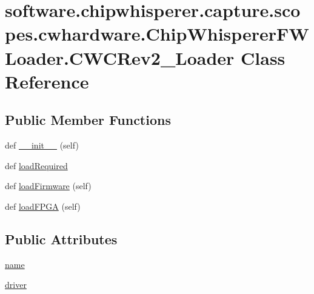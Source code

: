 \hypertarget{classsoftware_1_1chipwhisperer_1_1capture_1_1scopes_1_1cwhardware_1_1ChipWhispererFWLoader_1_1CWCRev2__Loader}{}\section{software.\+chipwhisperer.\+capture.\+scopes.\+cwhardware.\+Chip\+Whisperer\+F\+W\+Loader.\+C\+W\+C\+Rev2\+\_\+\+Loader Class Reference}
\label{classsoftware_1_1chipwhisperer_1_1capture_1_1scopes_1_1cwhardware_1_1ChipWhispererFWLoader_1_1CWCRev2__Loader}
\subsection*{Public Member Functions}
\begin{DoxyCompactItemize}
\item 
def \hyperlink{classsoftware_1_1chipwhisperer_1_1capture_1_1scopes_1_1cwhardware_1_1ChipWhispererFWLoader_1_1CWCRev2__Loader_a1d85659b55e50f31a0968f01e716eab5}{\+\_\+\+\_\+init\+\_\+\+\_\+} (self)
\item 
def \hyperlink{classsoftware_1_1chipwhisperer_1_1capture_1_1scopes_1_1cwhardware_1_1ChipWhispererFWLoader_1_1CWCRev2__Loader_a661fafff10a6a084cdf98057a0edf209}{load\+Required}
\item 
def \hyperlink{classsoftware_1_1chipwhisperer_1_1capture_1_1scopes_1_1cwhardware_1_1ChipWhispererFWLoader_1_1CWCRev2__Loader_aadd7278ccf9ade8801a01703d02f359b}{load\+Firmware} (self)
\item 
def \hyperlink{classsoftware_1_1chipwhisperer_1_1capture_1_1scopes_1_1cwhardware_1_1ChipWhispererFWLoader_1_1CWCRev2__Loader_a1b8a33d698ae66d43070e569727e7e1c}{load\+F\+P\+G\+A} (self)
\end{DoxyCompactItemize}
\subsection*{Public Attributes}
\begin{DoxyCompactItemize}
\item 
\hyperlink{classsoftware_1_1chipwhisperer_1_1capture_1_1scopes_1_1cwhardware_1_1ChipWhispererFWLoader_1_1CWCRev2__Loader_ae1c928f1cdcb05cf18d76c1a0630a712}{name}
\item 
\hyperlink{classsoftware_1_1chipwhisperer_1_1capture_1_1scopes_1_1cwhardware_1_1ChipWhispererFWLoader_1_1CWCRev2__Loader_a3d3c044dbbbabc567a1dae12b6dbb3f7}{driver}
\end{DoxyCompactItemize}


